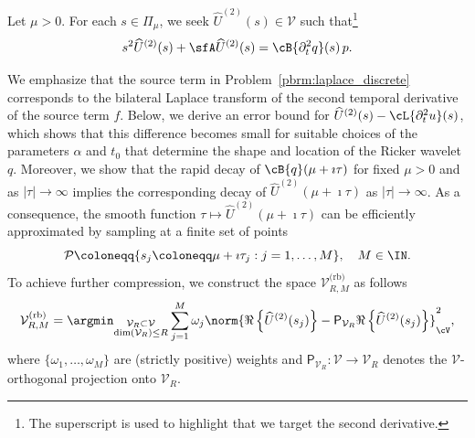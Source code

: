 \begin{problem}\label{pbrm:laplace_discrete}
Let $\mu>0$.
For each $s \in \Pi_\mu$,
we seek $\widehat{U}^{(2)}(s) \in \mathcal{V}$ such that\footnote{The superscript is used to highlight that we target the second derivative.}
\begin{equation}
    s^2  \widehat{U}^{(2)}(s) + \sfA \widehat{U}^{(2)}(s)= \cB\{\partial^2_t q\}(s)\, p.
\end{equation}
\end{problem}
We emphasize that the source term in Problem~\ref{pbrm:laplace_discrete} corresponds to the bilateral Laplace transform of the second temporal derivative of the source term $f$.
%
Below, we derive an error bound for \( \widehat{U}^{(2)}(s) - \cL\{\partial_t^2 u\}(s) \), which shows that this difference becomes small for suitable choices of the parameters \( \alpha \) and \( t_0 \) that determine the shape and location of the Ricker wavelet \( q \). Moreover, we show that the rapid decay of \( \cB\{q\}(\mu + \imath \tau) \) for fixed \( \mu > 0 \) and as \( |\tau| \to \infty \) implies the corresponding decay of \( \widehat{U}^{(2)}(\mu + \imath \tau) \) as \( |\tau| \to \infty \).
%
As a consequence, the smooth function \( \tau \mapsto \widehat{U}^{(2)}(\mu + \imath \tau) \) can be efficiently approximated by sampling at a finite set of points
\begin{equation}
    \mathcal{P}
    \coloneqq\{ s_j \coloneqq  \mu + \imath \tau_j : j = 1, \ldots, M \},
    \quad M \in \IN.
\end{equation}
To achieve further compression, we construct the space $\mathcal{V}^{\text{(rb)}}_{R,M}$ as follows
\begin{equation}\label{eq:fPOD}
	\mathcal{V}^{\text{(rb)}}_{R,M}
	=
	\argmin_{
	\substack{
		\mathcal{V}_R \subset \mathcal{V}
		\\
		\text{dim}(\mathcal{V}_R)\leq R	
	}
	}
    	\sum_{j=1}^{M} 
	\omega_j
	\norm{
		\Re
		\left\{
			\widehat{U}^{(2)}(s_j) 
		\right\}
		- 
		\mathsf{P}_{\mathcal{V}_R}
		\Re
		\left\{
			\widehat{U}^{(2)}(s_j) 
		\right\}
	}^2_{\cV},
\end{equation}
where $\{\omega_1,\ldots,\omega_{M}\}$ are (strictly positive) weights
and $\mathsf{P}_{\mathcal{V}_R}: \mathcal{V} \rightarrow \mathcal{V}_R$
denotes the $\mathcal{V}$-orthogonal projection onto $\mathcal{V}_R$.

